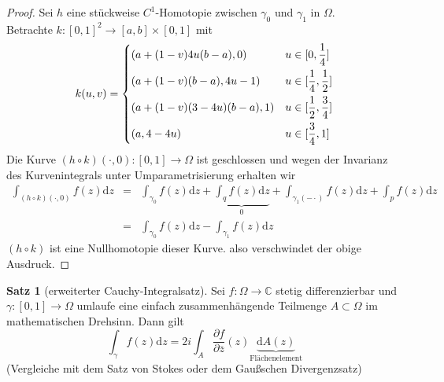 \documentclass[11pt,titlepage]{article}
\theoremstyle{definition}
\newtheorem{theorem}{Satz}[section]
\theoremstyle{remark}
\begin{document}
	\begin{proof}
		Sei $h$ eine stückweise $C^1$-Homotopie zwischen $\gamma_0$ und $\gamma_1$ in 
		$\Omega$. \\
		Betrachte $k:[0,1]^2 \to[a,b]\times[0,1]$ mit
		\[ k(u,v)=\begin{dcases} (a+(1-v)4u(b-a),0) & u\in[0,\frac{1}{4}] \\
		(a+(1-v)(b-a),4u-1) & u\in[\frac{1}{4},\frac{1}{2}] \\
		(a+(1-v)(3-4u)(b-a),1) & u\in [\frac{1}{2},\frac{3}{4}] \\
		(a,4-4u)& u\in[\frac{3}{4},1]
		\end{dcases} \]
		Die Kurve $(h\circ k)(\cdot,0):[0,1]\to\Omega$ ist geschlossen und wegen der Invarianz des 
		Kurvenintegrals unter Umparametrisierung erhalten wir 
		\begin{eqnarray*}
			\int_{(h\circ k)(\cdot,0)}f(z)\mathrm{d}z &=& \int_{\gamma_0}f(z)\mathrm{d}z +
			\underbrace{\int_q f(z)\mathrm{d}z}_{0} +\int_{\gamma_1 (-\cdot)}f(z)\mathrm{d}z +
			\int_p f(z)\mathrm{d}z \\
			&=&\int_{\gamma_0}f(z)\mathrm{d}z-\int_{\gamma_1}f(z)\mathrm{d}z
		\end{eqnarray*}
		$(h\circ k)$ ist eine Nullhomotopie dieser Kurve. also verschwindet der obige Ausdruck.
	\end{proof}
	
	\begin{theorem}[erweiterter Cauchy-Integralsatz]
		Sei $f:\Omega\to\mathbb{C}$ stetig differenzierbar und $\gamma:[0,1]\to\Omega$ umlaufe eine 
		einfach zusammenhängende Teilmenge $A\subset\Omega$ im mathematischen Drehsinn.
		Dann gilt
		\[\int_{\gamma}f(z)\mathrm{d}z =2i \int_A \frac{\partial f}{\partial \overline{z}}(z)
		\underbrace{\mathrm{d}A(z)}_{\text{Flächenelement}} \]
		(Vergleiche mit dem Satz von Stokes oder dem Gaußschen Divergenzsatz)
	\end{theorem}
	
\end{document}
